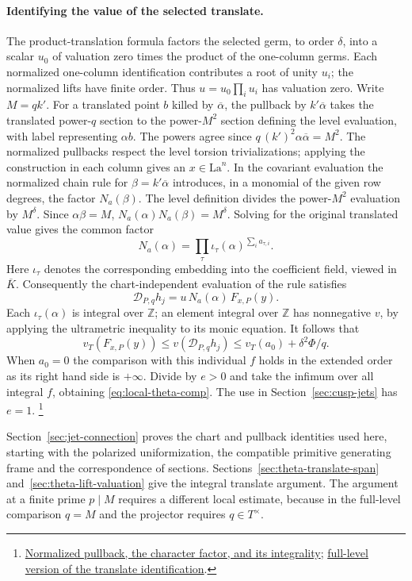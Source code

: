 \paragraph{Identifying the value of the selected translate.}
The product-translation formula factors the selected germ, to order
\(\delta\), into a scalar \(u_0\) of valuation zero times the product
of the one-column germs. Each normalized one-column identification
contributes a root of unity \(u_i\); the normalized lifts have
finite order. Thus \(u=u_0\prod_i u_i\) has valuation zero.
Write \(M=qk'\). For a translated point \(b\) killed by
\(\overline\alpha\), the pullback by \(k'\overline\alpha\) takes the
translated power-\(q\) section to the power-\(M^2\) section defining
the level evaluation, with label representing \(\alpha b\).
The powers agree since \(q\,(k')^2\alpha\overline\alpha=M^2\).
The normalized pullbacks respect the level torsion trivializations;
applying the construction in each column gives an \(x\in\mathrm{La}^n\).
In the covariant evaluation the normalized chain rule for \(\beta=k'\overline\alpha\)
introduces, in a monomial of the given row degrees, the factor
\(N_a(\beta)\). The level definition divides the power-\(M^2\)
evaluation by \(M^\delta\). Since \(\alpha\beta=M\),
\(N_a(\alpha)N_a(\beta)=M^\delta\). Solving for the original
translated value gives the common factor
\[
    N_a(\alpha)=\prod_{\tau}\iota_\tau(\alpha)^{\sum_i a_{\tau,i}} .
\]
Here \(\iota_\tau\) denotes the corresponding embedding into the
coefficient field, viewed in \(\overline K\). Consequently the
chart-independent evaluation of the rule satisfies
\[
     \mathcal D_{P,q}h_j=u\,N_a(\alpha)\,F_{x,P}(y).
\]
Each \(\iota_\tau(\alpha)\) is integral over \(\mathbb Z\); an
element integral over \(\mathbb Z\) has nonnegative \(v\), by
applying the ultrametric inequality to its monic equation.
It follows that
\[
 v_T(F_{x,P}(y))\le v(\mathcal D_{P,q}h_j)
             \le v_T(a_0)+\delta^2\Phi/q .
\]
When \(a_0=0\) the comparison with this individual \(f\) holds in
the extended order as its right hand side is \(+\infty\). Divide by
\(e>0\) and take the infimum over all integral \(f\), obtaining
\eqref{eq:local-theta-comp}. The use in
Section~\ref{sec:cusp-jets} has \(e=1\).
\footnote{\href{https://github.com/ChristianKudeba/alpoge-rh-verification/blob/alpoge-source-7cbf7a0c/src/Development/AbelianVarietyTheory/Proofs/DivisorProofs/HarmonicValueTranslateDivisorLevelIntegralChart.lean}{Normalized pullback, the character factor, and its integrality};
\href{https://github.com/ChristianKudeba/alpoge-rh-verification/blob/alpoge-source-7cbf7a0c/src/Development/AbelianVarietyTheory/Proofs/JetHarmonics/HarmonicValueTranslateEqUnitMulNormaliserThetaVa.lean}{full-level version of the translate identification}.}

Section~\ref{sec:jet-connection} proves the chart and pullback
identities used here, starting with the polarized uniformization,
the compatible primitive generating frame and the correspondence
of sections. Sections~\ref{sec:theta-translate-span}
and~\ref{sec:theta-lift-valuation} give the integral translate
argument. The argument at a finite prime \(p\mid M\) requires a
different local estimate, because in the full-level comparison
\(q=M\) and the projector requires \(q\in T^\times\).
